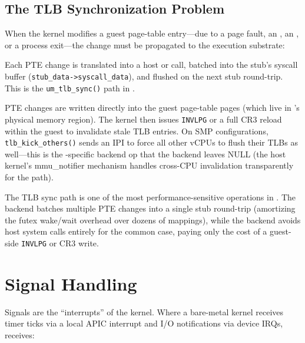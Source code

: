 \subsection{The TLB Synchronization Problem}
\label{sec:foundations:tlb-sync}

When the \UML{} kernel modifies a guest page-table entry---due to a
page fault, an , an , or a process
exit---the change must be propagated to the execution substrate:

\begin{description}[style=nextline]
  \item[Seccomp backend:]
    Each PTE change is translated into a host  or
     call, batched into the stub's syscall buffer
    (\texttt{stub\_data->syscall\_data}), and flushed on the next
    stub round-trip.  This is the \texttt{um\_tlb\_sync()} path in
    .

  \item[KVM backend:]
    PTE changes are written directly into the guest page-table pages
    (which live in \UML{}'s physical memory region).  The \UML{} kernel
    then issues \texttt{INVLPG} or a full CR3 reload within the guest
    to invalidate stale TLB entries.  On SMP configurations,
    \texttt{tlb\_kick\_others()} sends an IPI to force all other vCPUs
    to flush their TLBs as well---this is the \KVM{}-specific backend
    op that the \Seccomp{} backend leaves NULL (the host kernel's
    mmu\_notifier mechanism handles cross-CPU invalidation
    transparently for the \Seccomp{} path).
\end{description}

The TLB sync path is one of the most performance-sensitive operations
in \UML{}.  The \Seccomp{} backend batches multiple PTE changes into
a single stub round-trip (amortizing the futex wake/wait overhead over
dozens of mappings), while the \KVM{} backend avoids host system calls
entirely for the common case, paying only the cost of a guest-side
\texttt{INVLPG} or CR3 write.


\section{Signal Handling}
\label{sec:foundations:signals}

Signals are the ``interrupts'' of the \UML{} kernel.  Where a
bare-metal kernel receives timer ticks via a local APIC interrupt and
I/O notifications via device IRQs, \UML{} receives:

